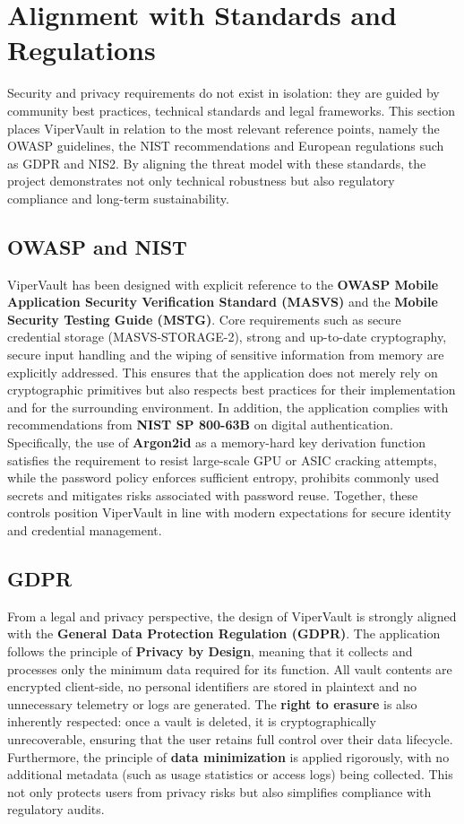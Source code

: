 \section{Alignment with Standards and Regulations}
	
	Security and privacy requirements do not exist in isolation: they are guided by community best practices, technical standards and legal frameworks.
	This section places ViperVault in relation to the most relevant reference points, namely the OWASP guidelines, the NIST recommendations and European regulations such as GDPR and NIS2.
	By aligning the threat model with these standards, the project demonstrates not only technical robustness but also regulatory compliance and long-term sustainability.
	
	\subsection{OWASP and NIST}
		
		ViperVault has been designed with explicit reference to the \textbf{OWASP Mobile Application Security Verification Standard (MASVS)} and the \textbf{Mobile Security Testing Guide (MSTG)}.
		Core requirements such as secure credential storage (MASVS-STORAGE-2), strong and up-to-date cryptography, secure input handling and the wiping of sensitive information from memory are explicitly addressed.
		This ensures that the application does not merely rely on cryptographic primitives but also respects best practices for their implementation and for the surrounding environment.
		In addition, the application complies with recommendations from \textbf{NIST SP 800-63B} on digital authentication.
		Specifically, the use of \textbf{Argon2id} as a memory-hard key derivation function satisfies the requirement to resist large-scale GPU or ASIC cracking attempts, while the password policy enforces sufficient entropy, prohibits commonly used secrets and mitigates risks associated with password reuse.
		Together, these controls position ViperVault in line with modern expectations for secure identity and credential management.
	
	\subsection{GDPR}
		
		From a legal and privacy perspective, the design of ViperVault is strongly aligned with the \textbf{General Data Protection Regulation (GDPR)}.
		The application follows the principle of \textbf{Privacy by Design}, meaning that it collects and processes only the minimum data required for its function.
		All vault contents are encrypted client-side, no personal identifiers are stored in plaintext and no unnecessary telemetry or logs are generated.
		The \textbf{right to erasure} is also inherently respected: once a vault is deleted, it is cryptographically unrecoverable, ensuring that the user retains full control over their data lifecycle.
		Furthermore, the principle of \textbf{data minimization} is applied rigorously, with no additional metadata (such as usage statistics or access logs) being collected.
		This not only protects users from privacy risks but also simplifies compliance with regulatory audits.
	

